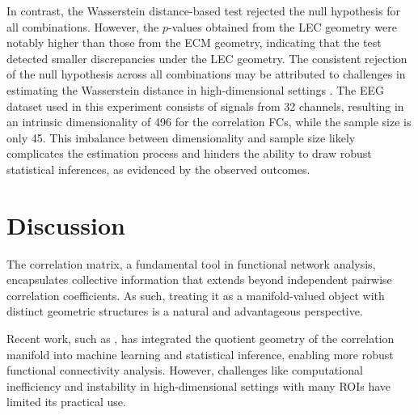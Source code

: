 \documentclass[10pt]{article}
\begin{document}
In contrast, the Wasserstein distance-based test rejected the null hypothesis for all combinations. However, the \(p\)-values obtained from the LEC geometry were notably higher than those from the ECM geometry, indicating that the test detected smaller discrepancies under the LEC geometry. The consistent rejection of the null hypothesis across all combinations may be attributed to challenges in estimating the Wasserstein distance in high-dimensional settings \citep{panaretos_2020_InvitationStatisticsWasserstein}. The EEG dataset used in this experiment consists of signals from 32 channels, resulting in an intrinsic dimensionality of 496 for the correlation FCs, while the sample size is only 45. This imbalance between dimensionality and sample size likely complicates the estimation process and hinders the ability to draw robust statistical inferences, as evidenced by the observed outcomes.


\section{Discussion}\label{sec:discussion}

The correlation matrix, a fundamental tool in functional network analysis, encapsulates collective information that extends beyond independent pairwise correlation coefficients. As such, treating it as a manifold-valued object with distinct geometric structures is a natural and advantageous perspective. 

Recent work, such as \cite{you_2022_GeometricLearningFunctional}, has integrated the quotient geometry of the correlation manifold into machine learning and statistical inference, enabling more robust functional connectivity analysis. However, challenges like computational inefficiency and instability in high-dimensional settings with many ROIs have limited its practical use.
\end{document}
